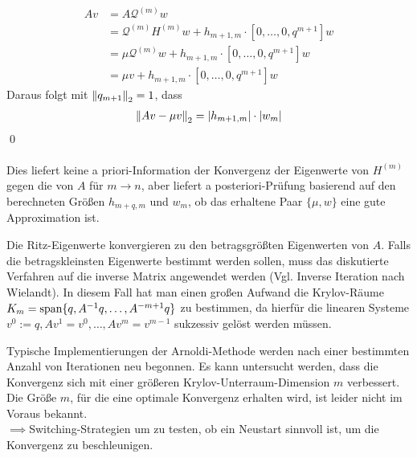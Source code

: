 \begin{align*}
Av &= A\mathcal{Q}^{(m)}w\\ 
&= \mathcal{Q}^{(m)}H^{(m)}w + h_{m+1,m}\cdot[0,\dots,0,q^{m+1}]w \\
&= \mu \mathcal{Q}^{(m)}w + h_{m+1,m}\cdot[0,\dots,0,q^{m+1}]w \\
&= \mu v + h_{m+1,m}\cdot[0,\dots,0,q^{m+1}]w
\end{align*}
Daraus folgt mit $\vertn{2}{q_{m+1}}_2 = 1$, dass
\begin{align*}\vertn{2}{Av-\mu v}_2 = |h_{m+1,m}|\cdot |w_m|\end{align*}
\qed \\ \\
Dies liefert keine a priori-Information der Konvergenz der Eigenwerte von $H^{(m)}$ gegen die von $A$ für $m\to n$, aber
liefert a posteriori-Prüfung basierend auf den berechneten Größen $h_{m+q,m}$ und $w_m$, ob das erhaltene Paar 
$\{\mu,w\}$ eine gute Approximation ist.
\begin{rembox}
  Die Ritz-Eigenwerte konvergieren zu den betragsgrößten Eigenwerten von $A$. Falls die betragskleinsten Eigenwerte 
  bestimmt werden sollen, muss das diskutierte Verfahren auf die inverse Matrix angewendet werden (Vgl. Inverse 
  Iteration nach Wielandt). In diesem Fall hat man einen großen Aufwand die Krylov-Räume 
  $K_m = \text{span}\{q,A^{-1}q,\dots,A^{-m+1}q\}$ zu bestimmen, da hierfür die linearen Systeme $v^0:=q, Av^1=v^0, 
  \dots, Av^m=v^{m-1}$ sukzessiv gelöst werden müssen.
\end{rembox}
\begin{rembox}
  Typische Implementierungen der Arnoldi-Methode werden nach einer bestimmten Anzahl von Iterationen neu begonnen.
  Es kann untersucht werden, dass die Konvergenz sich mit einer größeren Krylov-Unterraum-Dimension $m$ verbessert.
  Die Größe $m$, für die eine optimale Konvergenz erhalten wird, ist leider nicht im Voraus bekannt. \\
  $\implies$\glqq{}Switching\grqq{}-Strategien um zu testen, ob ein Neustart sinnvoll ist, 
  um die Konvergenz zu beschleunigen.
\end{rembox}
